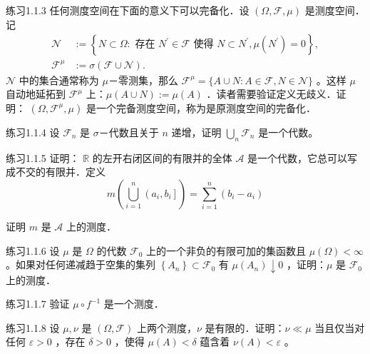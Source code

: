 \begin{namedthm}{练习1.1.3}
    任何测度空间在下面的意义下可以完备化．设 $(\Omega, \mathscr{F}, \mu)$ 是测度空间．记
$$
\begin{aligned}
\mathscr{N} & :=\left\{N \subset \Omega: \text { 存在 } N^{\prime} \in \mathscr{F} \text { 使得 } N \subset N^{\prime}, \mu\left(N^{\prime}\right)=0\right\}, \\
\mathscr{F}^{\mu} & :=\sigma(\mathscr{F} \cup \mathscr{N}) .
\end{aligned}
$$
$\mathscr{N}$ 中的集合通常称为 $\mu$－零测集，那么 $\mathscr{F}^{\mu}=\{A \cup N: A \in \mathscr{F}, N \in \mathscr{N}\}$ 。这样 $\mu$ 自动地延拓到 $\mathscr{F}^{\mu}$ 上：$\mu(A \cup N):=\mu(A)$ ．读者需要验证定义无歧义．证明： $\left(\Omega, \mathscr{F}^{\mu}, \mu\right)$ 是一个完备测度空间，称为是原测度空间的完备化．
\end{namedthm}

\begin{namedthm}{练习1.1.4}
   设 $\mathscr{F}_{n}$ 是 $\sigma$－代数且关于 $n$ 递增，证明 $\bigcup_{n} \mathscr{F}_{n}$ 是一个代数。
\end{namedthm}

\begin{namedthm}{练习1.1.5}
    证明： $\mathbb{R}$ 的左开右闭区间的有限并的全体 $\mathscr{A}$ 是一个代数，它总可以写成不交的有限并．定义
$$
m\left(\bigcup_{i=1}^{n}\left(a_{i}, b_{i}\right]\right)=\sum_{i=1}^{n}\left(b_{i}-a_{i}\right)
$$

证明 $m$ 是 $\mathscr{A}$ 上的测度．
\end{namedthm}

\begin{namedthm}{练习1.1.6}
    设 $\mu$ 是 $\Omega$ 的代数 $\mathscr{F}_{0}$ 上的一个非负的有限可加的集函数且 $\mu(\Omega)<\infty$ 。如果对任何递减趋于空集的集列 $\left\{A_{n}\right\} \subset \mathscr{F}_{0}$ 有 $\mu\left(A_{n}\right) \downarrow 0$ ，证明：$\mu$ 是 $\mathscr{F}_{0}$ 上的测度．
\end{namedthm}

\begin{namedthm}{练习1.1.7}
验证 $\mu \circ f^{-1}$ 是一个测度．
\end{namedthm}

\begin{namedthm}{练习1.1.8}
    设 $\mu, \nu$ 是 $(\Omega, \mathscr{F})$ 上两个测度，$\nu$ 是有限的．证明：$\nu \ll \mu$ 当且仅当对任何 $\varepsilon>0$ ，存在 $\delta>0$ ，使得 $\mu(A)<\delta$ 蕴含着 $\nu(A)<\varepsilon$ 。
\end{namedthm}


